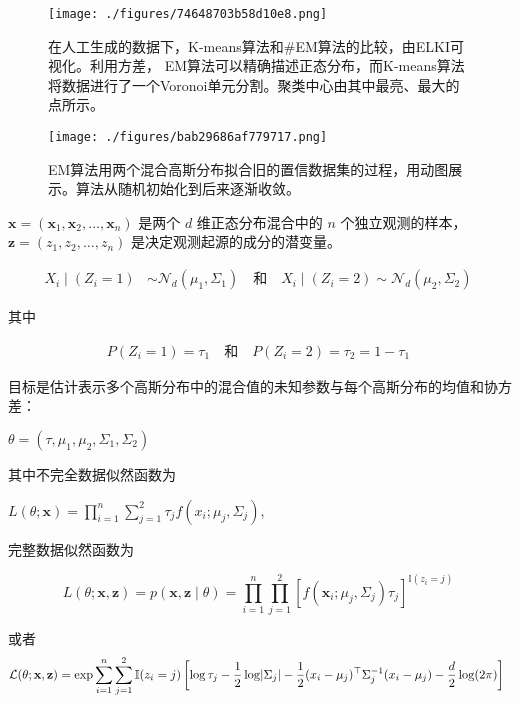 \begin{figure}[ht]
\centering
\texttt{[image: ./figures/74648703b58d10e8.png]}
\caption{在人工生成的数据下，K-means算法和#EM算法的比较，由ELKI可视化。利用方差， EM算法可以精确描述正态分布，而K-means算法将数据进行了一个Voronoi单元分割。聚类中心由其中最亮、最大的点所示。} \label{fig_ZDQW_2}
\end{figure}

\begin{figure}[ht]
\centering
\texttt{[image: ./figures/bab29686af779717.png]}
\caption{EM算法用两个混合高斯分布拟合旧的置信数据集的过程，用动图展示。算法从随机初始化到后来逐渐收敛。} \label{fig_ZDQW_3}
\end{figure}

$\mathbf{x} = (\mathbf{x}_1, \mathbf{x}_2, \ldots, \mathbf{x}_n)$ 是两个 $d$ 维正态分布混合中的 $n$ 个独立观测的样本，$\mathbf{z} = (z_1, z_2, \ldots, z_n)$ 是决定观测起源的成分的潜变量。

\begin{align}
X_i \mid (Z_i = 1) &\sim \mathcal{N}_d(\mu_1, \Sigma_1) \quad \text{和} \quad X_i \mid (Z_i = 2) \sim \mathcal{N}_d(\mu_2, \Sigma_2)~
\end{align}

其中

\begin{align}
P(Z_i = 1) = \tau_1 \quad \text{和} \quad P(Z_i = 2) = \tau_2 = 1 - \tau_1~
\end{align}

目标是估计表示多个高斯分布中的混合值的未知参数与每个高斯分布的均值和协方差：

$\theta = (\tau, \mu_1, \mu_2, \Sigma_1, \Sigma_2)$

其中不完全数据似然函数为

$L(\theta; \mathbf{x}) = \prod_{i=1}^{n} \sum_{j=1}^{2} \tau_j f \left( x_i; \mu_j, \Sigma_j \right)$,

完整数据似然函数为

\begin{equation}
L(\theta; \mathbf{x}, \mathbf{z}) = p(\mathbf{x}, \mathbf{z} \mid \theta) = \prod_{i=1}^{n} \prod_{j=1}^{2} \left[ f(\mathbf{x}_i; \mu_j, \Sigma_j) \tau_j \right]^{\mathbb{I}(z_i = j)}~
\end{equation}

或者
\begin{equation}
\mathcal{L}(\theta; \mathbf{x}, \mathbf{z}) = \exp \\{\sum_{i=1}^{n} \sum_{j=1}^{2} \mathbb{I}(z_i = j)\left[\log \tau_j - \frac{1}{2} \log \lvert \Sigma_j \rvert - \frac{1}{2} (x_i - \mu_j)^\top \Sigma_j^{-1} (x_i - \mu_j) - \frac{d}{2} \log(2\pi)\right]\\}~
\end{equation}



